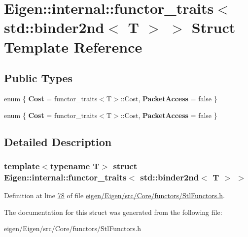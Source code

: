 \hypertarget{struct_eigen_1_1internal_1_1functor__traits_3_01std_1_1binder2nd_3_01_t_01_4_01_4}{}\section{Eigen\+:\+:internal\+:\+:functor\+\_\+traits$<$ std\+:\+:binder2nd$<$ T $>$ $>$ Struct Template Reference}
\label{struct_eigen_1_1internal_1_1functor__traits_3_01std_1_1binder2nd_3_01_t_01_4_01_4}
\subsection*{Public Types}
\begin{DoxyCompactItemize}
\item 
\mbox{\label{struct_eigen_1_1internal_1_1functor__traits_3_01std_1_1binder2nd_3_01_t_01_4_01_4_a01309a2e94fe6e1674f518f00848fa08}} 
enum \{ {\bfseries Cost} = functor\+\_\+traits$<$T$>$\+:\+:Cost, 
{\bfseries Packet\+Access} = false
 \}
\item 
\mbox{\label{struct_eigen_1_1internal_1_1functor__traits_3_01std_1_1binder2nd_3_01_t_01_4_01_4_a4df593f21335d2f5ff49699e2d4ade54}} 
enum \{ {\bfseries Cost} = functor\+\_\+traits$<$T$>$\+:\+:Cost, 
{\bfseries Packet\+Access} = false
 \}
\end{DoxyCompactItemize}


\subsection{Detailed Description}
\subsubsection*{template$<$typename T$>$\newline
struct Eigen\+::internal\+::functor\+\_\+traits$<$ std\+::binder2nd$<$ T $>$ $>$}



Definition at line \hyperlink{eigen_2_eigen_2src_2_core_2functors_2_stl_functors_8h_source_l00078}{78} of file \hyperlink{eigen_2_eigen_2src_2_core_2functors_2_stl_functors_8h_source}{eigen/\+Eigen/src/\+Core/functors/\+Stl\+Functors.\+h}.



The documentation for this struct was generated from the following file\+:\begin{DoxyCompactItemize}
\item 
eigen/\+Eigen/src/\+Core/functors/\+Stl\+Functors.\+h\end{DoxyCompactItemize}
